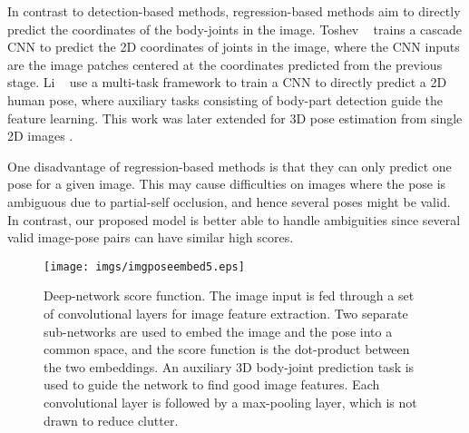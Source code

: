 \documentclass[10pt,twocolumn,letterpaper]{article}
\begin{document}
In contrast to detection-based methods, regression-based methods aim to directly predict the coordinates of the body-joints in the image.
%
Toshev \etal~\cite{deeppose2014} trains a cascade CNN to predict the 2D coordinates of joints in the image, where the CNN inputs are the image patches centered at the coordinates predicted from the previous stage.
%
Li \etal~\cite{hmlpeijcv} use a multi-task framework to train a CNN to directly predict a 2D human pose, where auxiliary tasks consisting of body-part detection guide the feature learning.
This work was later extended for 3D pose estimation from single 2D images  \cite{accv2014}.

%

One disadvantage of regression-based methods is that they can only predict one pose for a given image.  This may cause difficulties on images where the pose is ambiguous due to partial-self occlusion, and hence several poses might be valid.
%
%
%
%
In contrast, our proposed model is better able to handle ambiguities since several valid image-pose pairs can have similar high scores.
 
\begin{figure*}[t]
\begin{center}  
% 
   \texttt{[image: imgs/imgposeembed5.eps]}
\end{center}
\vspace{-0.1in}
   \caption{Deep-network score function.  The image input is fed through a set of convolutional layers for image feature extraction. Two separate sub-networks are used to embed the image and the pose into a common space, and the score function is the dot-product between the two embeddings.
An auxiliary 3D body-joint prediction task is used to guide the network to find good image features.
Each convolutional layer is followed by a max-pooling layer, which is not drawn to reduce clutter.}
\label{fig:imgposenet}
\vspace{-0.15in}
\end{figure*} 
 

   
\end{document}
